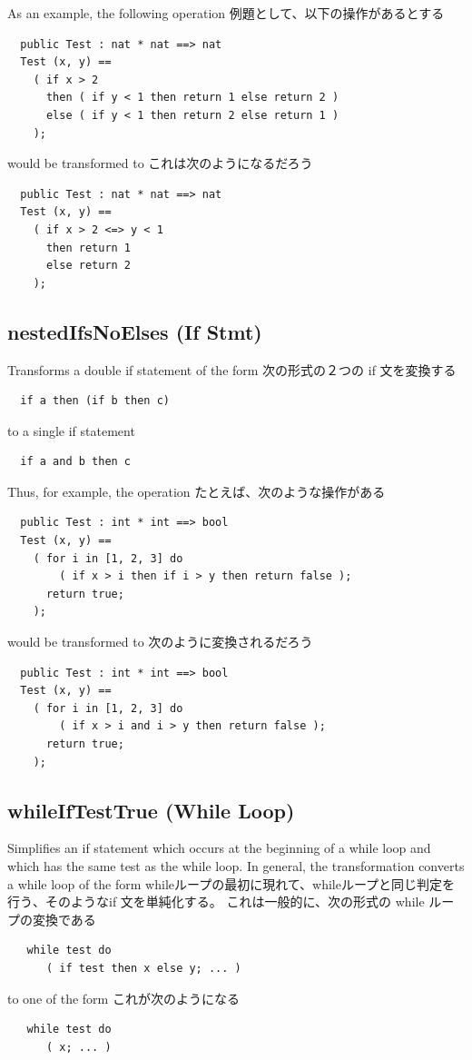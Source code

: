 \documentclass[\pformat,12pt]{jarticle}
\begin{document}
As an example, the following operation
例題として、以下の操作があるとする
\begin{verbatim}
  public Test : nat * nat ==> nat  
  Test (x, y) ==
    ( if x > 2 
      then ( if y < 1 then return 1 else return 2 )
      else ( if y < 1 then return 2 else return 1 ) 
    );
\end{verbatim}
would be transformed to
これは次のようになるだろう
\begin{verbatim}
  public Test : nat * nat ==> nat  
  Test (x, y) ==
    ( if x > 2 <=> y < 1 
      then return 1 
      else return 2 
    );
\end{verbatim}

\subsection{nestedIfsNoElses (If Stmt)}
  Transforms a double if statement of the form
  次の形式の２つの if 文を変換する
\begin{verbatim}
  if a then (if b then c)
\end{verbatim}
to a single if statement
\begin{verbatim}
  if a and b then c
\end{verbatim}

Thus, for example, the operation
たとえば、次のような操作がある
\begin{verbatim}
  public Test : int * int ==> bool
  Test (x, y) ==
    ( for i in [1, 2, 3] do
        ( if x > i then if i > y then return false );
      return true;
    );
\end{verbatim}
would be transformed to
次のように変換されるだろう
\begin{verbatim}
  public Test : int * int ==> bool
  Test (x, y) ==
    ( for i in [1, 2, 3] do
        ( if x > i and i > y then return false );
      return true;
    );
\end{verbatim}

\subsection{whileIfTestTrue (While Loop)}
  Simplifies an if statement which occurs at the beginning of a while
  loop and which has the same test as the while loop. In general, the
  transformation converts a while loop of the form
 whileループの最初に現れて、whileループと同じ判定を行う、そのようなif 文を単純化する。
これは一般的に、次の形式の while ループの変換である
\begin{verbatim}
   while test do  
      ( if test then x else y; ... ) 
\end{verbatim}
to one of the form
これが次のようになる
\begin{verbatim}
   while test do  
      ( x; ... ) 
\end{verbatim}
\end{document}
